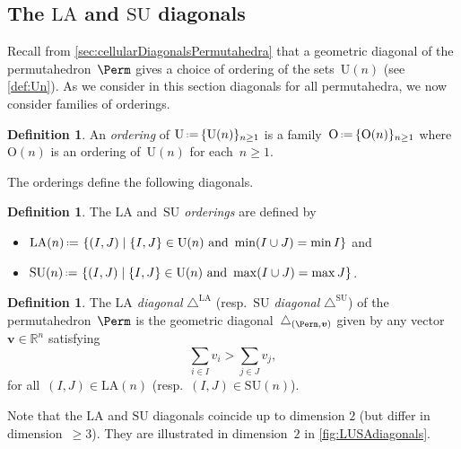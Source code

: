 \documentclass{amsart}
\newcommand{\darkblue}{\color{darkblue}} %
\theoremstyle{definition}
\newtheorem{definition}[theorem]{Definition}
\newcommand{\R}{\mathbb{R}} %
\renewcommand{\b}[1]{{\boldsymbol{#1}}} %
\newcommand{\Un}{\mathrm{U}} %
\newcommand{\Or}{\mathrm{O}} %
\newcommand{\set}[2]{\left\{ #1 \;\middle|\; #2 \right\}} %
\newcommand{\eqdef}{\mbox{\,\raisebox{0.2ex}{\scriptsize\ensuremath{\mathrm:}}\ensuremath{=}\,}} %
\newcommand{\resp}{resp.~} %
\newcommand{\defn}[1]{\textsl{\darkblue #1}} %
\renewcommand{\b}[1]{\boldsymbol{#1}} %
\newcommand{\SU}{\mathrm{SU}}
\newcommand{\LA}{\mathrm{LA}}
\newcommand{\SUD}{\triangle^{\mathrm{SU}}}
\newcommand{\LAD}{\triangle^{\mathrm{LA}}}
\begin{document}

\subsection{The $\LA$ and $\SU$ diagonals}
\label{subsec:LASUdiagonal}

Recall from \cref{sec:cellularDiagonalsPermutahedra} that a geometric diagonal of the permutahedron~$\Perm$ gives a choice of ordering of the sets~$\Un(n)$ (see \cref{def:Un}).
As we consider in this section diagonals for all permutahedra, we now consider families of orderings.

\begin{definition}
An \defn{ordering} of $\Un \eqdef \{\Un(n)\}_{n \ge 1}$ is a family~$\Or \eqdef \{\Or(n)\}_{n \ge 1}$ where~$\Or(n)$ is an ordering of~$\Un(n)$ for each~$n \ge 1$.
\end{definition}

The orderings define the following diagonals.

\begin{definition}
The \defn{$\LA$} and~\defn{$\SU$ orderings} are defined by
\begin{itemize} 
	\item $\LA(n) \eqdef \set{(I,J)}{\{I,J\} \in \Un(n) \text{ and } \min(I\cup J) = \min I}$ and
	\item $\SU(n) \eqdef \set{(I,J)}{\{I,J\} \in \Un(n) \text{ and } \max(I\cup J) = \max J}$.
\end{itemize}
\end{definition}

\begin{definition}
\label{def:LA-and-SU}
The \defn{$\LA$ diagonal} $\LAD$ (\resp \defn{$\SU$ diagonal} $\SUD$) of the permutahedron~$\Perm$ is the geometric diagonal~$\triangle_{(\Perm,\b{v})}$ given by any vector $\b{v} \in \R^n$ satisfying  
\[
\sum_{i \in I} v_i > \sum_{j \in J} v_j,
\]
for all~$(I,J) \in \LA(n)$ (\resp $(I,J) \in \SU(n)$).
\end{definition}

Note that the $\LA$ and $\SU$ diagonals coincide up to dimension $2$ (but differ in dimension~$\ge 3$).
They are illustrated in dimension~$2$ in \cref{fig:LUSAdiagonals}.
\end{document}
